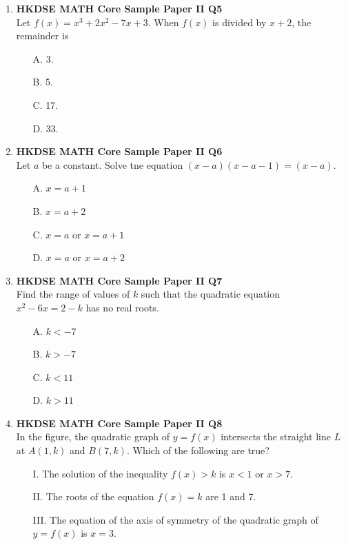 \documentclass[12pt]{article}
\begin{document}
\begin{enumerate}
	\item \textbf{HKDSE MATH Core Sample Paper II Q5}\\
	Let $f(x) = x^3 + 2x^2 - 7x + 3$. When $f(x)$ is divided by $x + 2$, the remainder is 
	\begin{enumerate}
		\item[A.] 3.
		\item[B.] 5.
		\item[C.] 17.
		\item[D.] 33.
	\end{enumerate}

	\item \textbf{HKDSE MATH Core Sample Paper II Q6}\\
	Let $a$ be a constant. Solve tne equation $(x - a)(x - a - 1) = (x - a)$.
	\begin{enumerate}
		\item[A.] $x = a + 1$
		\item[B.] $x = a + 2$
		\item[C.] $x = a$ or $x = a + 1$
		\item[D.] $x = a$ or $x = a + 2$
	\end{enumerate}

	\item \textbf{HKDSE MATH Core Sample Paper II Q7}\\
	Find the range of values of $k$ such that the quadratic equation $x^2 - 6x = 2 - k$ has no real roots.
	\begin{enumerate}
		\item[A.] $k < -7$
		\item[B.] $k > -7$
		\item[C.] $k < 11$
		\item[D.] $k > 11$
	\end{enumerate}

	\item \textbf{HKDSE MATH Core Sample Paper II Q8}\\
	In the figure, the quadratic graph of $y = f(x)$ intersects the straight line $L$ at $A(1 , k)$ and $B(7 , k)$. Which of the following are true?
	\begin{enumerate}
		\item[I.] The solution of the inequality $f(x) > k$ is $x < 1$ or $x > 7$.
		\item[II.] The roots of the equation $f(x) = k$ are 1 and 7.
		\item[III.] The equation of the axis of symmetry of the quadratic graph of $y = f(x)$ is $x = 3$.
		\item[]
		\begin{enumerate}


\end{enumerate}
\end{enumerate}
\end{enumerate}
\end{document}
